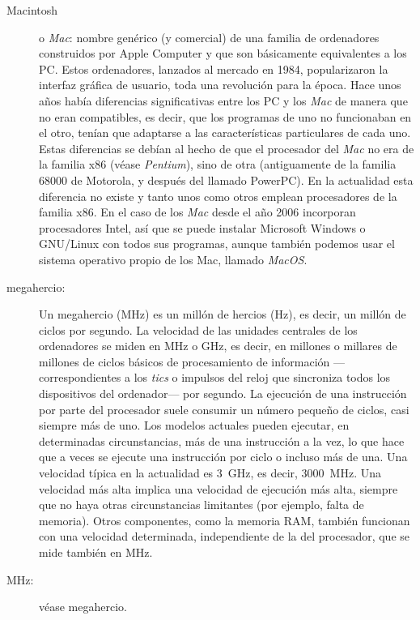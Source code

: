 \begin{description}
\item[Macintosh] o \emph{Mac}: nombre genérico (y comercial) de una familia de ordenadores construidos por Apple Computer y que son básicamente equivalentes a los PC. Estos ordenadores, lanzados al mercado en 1984, popularizaron la interfaz gráfica de usuario, toda una revolución para la época. Hace unos años había diferencias significativas entre los PC y los \emph{Mac} de manera que no eran compatibles, es decir, que los programas de uno no funcionaban en el otro, tenían que adaptarse a las características particulares de cada uno. Estas diferencias se debían al hecho de que el procesador del \emph{Mac} no era de la familia x86 (véase \emph{Pentium}), sino de otra (antiguamente de la familia 68000 de Motorola, y después del llamado PowerPC). En la actualidad esta diferencia no existe y tanto unos como otros emplean procesadores de la familia x86. En el caso de los \emph{Mac} desde el año 2006 incorporan procesadores Intel, así que se puede instalar Microsoft Windows o GNU/Linux con todos sus programas, aunque también podemos usar el sistema operativo propio de los Mac, llamado \emph{MacOS}. 

\item[megahercio:] Un megahercio (MHz) es un millón de hercios (Hz), es decir, un millón de ciclos por segundo. La velocidad de las unidades centrales de los ordenadores se miden en MHz o GHz, es decir, en millones o millares de millones de ciclos básicos de procesamiento de información ---correspondientes a los \emph{tics} o impulsos del reloj que sincroniza todos los dispositivos del ordenador--- por segundo. La ejecución de una instrucción por parte del procesador suele consumir un número pequeño de ciclos, casi siempre más de uno. Los modelos actuales pueden ejecutar, en determinadas circunstancias, más de una instrucción a la vez, lo que hace que a veces se ejecute una instrucción por ciclo o incluso más de una. Una velocidad típica en la actualidad es 3~GHz, es decir, 3000~MHz. Una velocidad más alta implica una velocidad de ejecución más alta, siempre que no haya otras circunstancias limitantes (por ejemplo, falta de memoria). Otros componentes, como la memoria RAM, también funcionan con una velocidad determinada, independiente de la del procesador, que se mide también en MHz. 

\item[MHz:] véase megahercio. 


\end{description}
